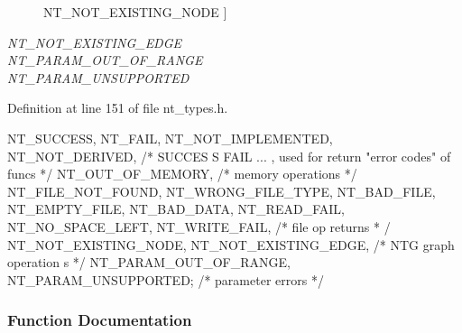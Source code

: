 \begin{Desc}
\begin{description}
{NT\_\-NOT\_\-EXISTING\_\-NODE\label{nt__types_8h_ab9564ee8f091e809d21b8451c6683c53a26c6165dbced8c5ef75255f5a27ae91d}
}]\item[{\em 
NT\_\-NOT\_\-EXISTING\_\-EDGE\label{nt__types_8h_ab9564ee8f091e809d21b8451c6683c53a9ebeeb0b946e24badf81c9f55ba92b04}
}]\item[{\em 
NT\_\-PARAM\_\-OUT\_\-OF\_\-RANGE\label{nt__types_8h_ab9564ee8f091e809d21b8451c6683c53a551827d8c803386774c9a4390d764370}
}]\item[{\em 
NT\_\-PARAM\_\-UNSUPPORTED\label{nt__types_8h_ab9564ee8f091e809d21b8451c6683c53af8fc8207dcd1011f3be8b3e03a75c161}
}]\end{description}
\end{Desc}



Definition at line 151 of file nt\_\-types.h.




\begin{DoxyCode}
              {NT_SUCCESS, NT_FAIL, NT_NOT_IMPLEMENTED, NT_NOT_DERIVED, /* SUCCES
      S FAIL ... , used for return "error codes" of funcs */
               NT_OUT_OF_MEMORY, /* memory operations */
               NT_FILE_NOT_FOUND, NT_WRONG_FILE_TYPE, NT_BAD_FILE, NT_EMPTY_FILE,
       NT_BAD_DATA, NT_READ_FAIL, NT_NO_SPACE_LEFT, NT_WRITE_FAIL, /* file op returns *
      /
               NT_NOT_EXISTING_NODE, NT_NOT_EXISTING_EDGE, /* NTG graph operation
      s */
           NT_PARAM_OUT_OF_RANGE, NT_PARAM_UNSUPPORTED}; /* parameter errors */
\end{DoxyCode}




\subsubsection{Function Documentation}
